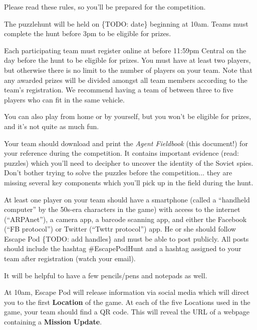 \documentclass{puzzlehunt}
\begin{document}
Please read these rules, so you'll be prepared for the competition.


The puzzlehunt will be held on \{TODO: date\} beginning at 10am. Teams must
complete the hunt before 3pm to be eligible for prizes.


Each participating team must register online at
before 11:59pm Central on the day before the hunt to be eligible for prizes.
You must have at least two
players, but otherwise there is no limit to the
number of players on your team. Note that any awarded prizes will be divided amongst
all team members according to the team's registration. We recommend having
a team of between three to five players who can fit in the same vehicle.

You can also play from home or by yourself, but you won't be eligible for prizes, and
it's not quite as much fun.


Your team should download and print the \textit{Agent Fieldbook} (this document!)
for your reference during the competition. It contains important evidence
(read: puzzles) which you'll need to decipher to uncover the identity of the
Soviet spies. Don't bother trying to solve the puzzles before the competition...
they are missing several key components which you'll pick up in the field during
the hunt.

At least one player on your team should have a smartphone (called a
``handheld computer'' by the 50s-era characters in the game) with access to the
internet (``ARPAnet''), a camera app, a barcode scanning app, and either
the Facebook (``FB protocol'') or Twitter (``Twttr protocol'') app.
He or she should follow Escape Pod \{TODO: add handles\} and must be able
to post publicly. All posts should include the hashtag \#EscapePodHunt
and a hashtag assigned to your team after registration (watch your email).

It will be helpful to have a few pencils/pens and notepads as well.


At 10am, Escape Pod will release information via social media which will direct
you to the first \textbf{Location} of the game. At each of the five Locations used
in the game, your team should find a QR code. This will reveal the URL of a
webpage containing a \textbf{Mission Update}.
\end{document}
